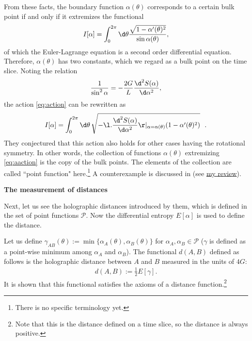 \documentclass[12pt]{article}
\begin{document}
From these facts, the boundary function $\alpha(\theta)$ corresponds to a certain bulk point 
if and only if it extremizes the functional
\begin{align}
	I[\alpha] = \int_0^{2\pi}\d\theta \frac{\sqrt{1-\alpha'(\theta)^2}}{\sin\alpha(\theta)},\label{eq:action}
\end{align}
of which the Euler-Lagrange equation is a second order differential equation.
Therefore, $\alpha(\theta)$ has two constants, which we regard as a bulk point on the time slice.
Noting the relation
\begin{align}
	\frac{1}{\sin^2\alpha} = -\frac{2G}{L}\frac{\d^2S(\alpha)}{\d\alpha^2},
\end{align}
the action \eqref{eq:action} can be rewritten as 
\begin{align}
	I[\alpha] = \int_0^{2\pi}\d\theta\,\sqrt{-\l.\frac{\d^2S(\alpha)}{\d\alpha^2}\r|_{\alpha = \alpha(\theta)}(1-\alpha'(\theta)^2)}~~.\label{eq:aaction}
\end{align}
They conjectured that this action also holds for other cases having the rotational symmetry.
In other words, the collection of functions $\alpha(\theta)$ extremizing \eqref{eq:aaction} is the copy of the bulk points.
The elements of the collection are called ``point function" here.\footnote{There is no specific terminology yet.}
A counterexample is discussed in \cite{Burda:2018rpb} 
(see \href{https://albertmcc.github.io/web/reviews/holographic_bubble.pdf}{\color{blue}my review}).


\noindent
\textbf{The measurement of distances}

Next, let us see the holographic distances introduced by them, which is defined in the set of point functions $\mathcal P$.
Now the differential entropy $E[\alpha]$ is used to define the distance.

Let us define $\gamma_{AB}(\theta) := \min\{\alpha_A(\theta),\alpha_B(\theta)\}$ for $\alpha_A,\alpha_B\in\mathcal P$ 
($\gamma$ is defined as a point-wise minimum among $\alpha_A$ and $\alpha_B$).
The functional $d(A,B)$ defined as follows is the holographic distance between 
$A$ and $B$ measured in the units of $4G$:
\begin{align}
	d(A,B) := \frac{1}{2}E[\gamma].\label{eq:dist}
\end{align}
It is shown that this functional satisfies the axioms of a distance function.\footnote{
Note that this is the distance defined on a time slice, so the distance is always positive.}
\end{document}
